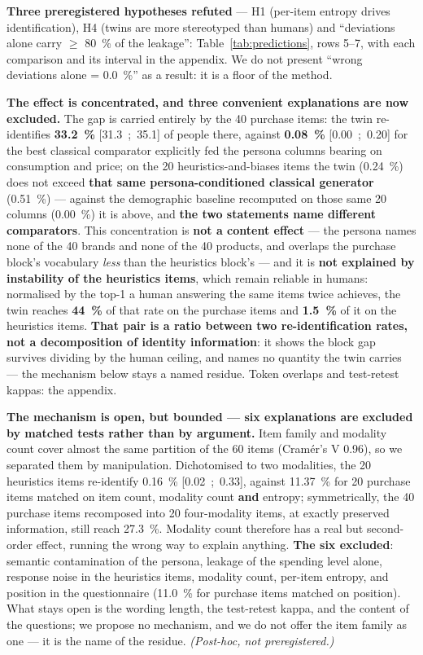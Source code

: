 \documentclass[sigconf,anonymous,review]{acmart}
\begin{document}
\textbf{Three preregistered hypotheses refuted} --- H1 (per-item entropy drives identification), H4 (twins are more stereotyped than humans) and ``deviations alone carry $\geq$ 80~\% of the leakage'': Table~\ref{tab:predictions}, rows 5--7, with each comparison and its interval in the appendix. We do not present ``wrong deviations alone = 0.0~\%'' as a result: it is a floor of the method.

\textbf{The effect is concentrated, and three convenient explanations are now excluded.} The gap is carried entirely by the 40 purchase items: the twin re-identifies \textbf{33.2~\%} [31.3~;~35.1] of people there, against \textbf{0.08~\%} [0.00~;~0.20] for the best classical comparator explicitly fed the persona columns bearing on consumption and price; on the 20 heuristics-and-biases items the twin (0.24~\%) does not exceed \textbf{that same persona-conditioned classical generator} (0.51~\%) --- against the demographic baseline recomputed on those same 20 columns (0.00~\%) it is above, and \textbf{the two statements name different comparators}. This concentration is \textbf{not a content effect} --- the persona names none of the 40 brands and none of the 40 products, and overlaps the purchase block's vocabulary \textit{less} than the heuristics block's --- and it is \textbf{not explained by instability of the heuristics items}, which remain reliable in humans: normalised by the top-1 a human answering the same items twice achieves, the twin reaches \textbf{44~\%} of that rate on the purchase items and \textbf{1.5~\%} of it on the heuristics items. \textbf{That pair is a ratio between two re-identification rates, not a decomposition of identity information}: it shows the block gap survives dividing by the human ceiling, and names no quantity the twin carries --- the mechanism below stays a named residue. Token overlaps and test-retest kappas: the appendix.

\textbf{The mechanism is open, but bounded --- six explanations are excluded by matched tests rather than by argument.} Item family and modality count cover almost the same partition of the 60 items (Cramér's V 0.96), so we separated them by manipulation. Dichotomised to two modalities, the 20 heuristics items re-identify 0.16~\% [0.02~;~0.33], against 11.37~\% for 20 purchase items matched on item count, modality count \textbf{and} entropy; symmetrically, the 40 purchase items recomposed into 20 four-modality items, at exactly preserved information, still reach 27.3~\%. Modality count therefore has a real but second-order effect, running the wrong way to explain anything. \textbf{The six excluded}: semantic contamination of the persona, leakage of the spending level alone, response noise in the heuristics items, modality count, per-item entropy, and position in the questionnaire (11.0~\% for purchase items matched on position). What stays open is the wording length, the test-retest kappa, and the content of the questions; we propose no mechanism, and we do not offer the item family as one --- it is the name of the residue. \textit{(Post-hoc, not preregistered.)}
\end{document}
